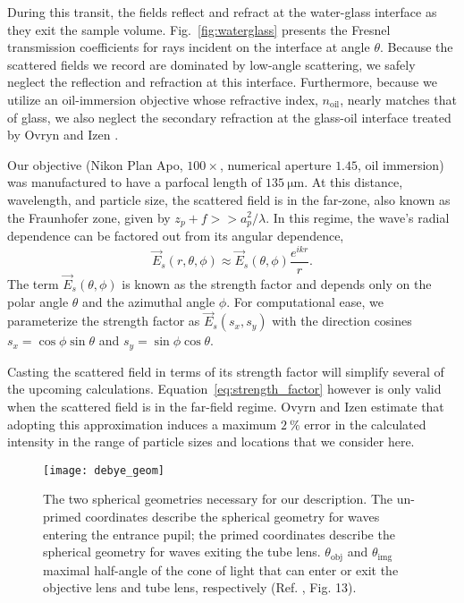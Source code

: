 During this transit, the fields reflect and refract at the water-glass interface as they
exit the sample volume. Fig.~\ref{fig:waterglass} presents the Fresnel transmission
coefficients for rays incident on the interface at angle $\theta$.
Because the scattered fields we record are dominated by low-angle scattering,
we safely neglect the reflection and refraction at this interface. Furthermore,
because we utilize an
oil-immersion objective whose refractive index, $n_{\text{oil}}$,
nearly matches that of glass, we also neglect the secondary refraction at the
glass-oil interface treated by Ovryn and Izen \cite{izen00}.

Our objective  (Nikon Plan Apo, $\num{100}\times$, numerical aperture $\num{1.45}$,
oil immersion) was manufactured to have a parfocal length of $\SI{135}{\um}$.
At this distance, wavelength, and particle size, the scattered field is in the far-zone,
also known as the Fraunhofer zone, given by $z_p + f >> a_p^2/\lambda$. In this
regime, the wave's radial dependence can be factored out from its angular dependence,
\begin{equation}
  \label{eq:strength_factor}
  \vec{E}_s(r, \theta, \phi) \approx  \vec{E}_s(\theta, \phi) \frac{e^{ikr}}{r}.
\end{equation}
The term $\vec{E}_s(\theta, \phi)$ is known as the strength factor and
depends only on the polar angle $\theta$ and the azimuthal angle $\phi$.
For computational ease, we parameterize the strength factor as $\vec{E}_s(s_x, s_y)$
with the direction cosines $s_x=\cos{\phi}\sin{\theta}$ and $s_y = \sin{\phi}\cos{\theta}$.

Casting the scattered field in terms of its strength factor will simplify
several of the upcoming calculations. Equation~\eqref{eq:strength_factor} however
is only valid when the scattered field is in the far-field regime.
Ovyrn and Izen\cite{izen00} estimate that adopting this approximation induces a maximum
$\SI{2}{\percent}$ error in the calculated intensity in the range of particle
sizes and locations that we consider here. %

\begin{figure}
  \centering
  \texttt{[image: debye\_geom]}
  \caption{The two spherical geometries necessary for our description. The un-primed coordinates
    describe the spherical geometry for waves entering the entrance pupil; the primed coordinates
    describe the spherical geometry for waves exiting the tube lens. $\theta_{\text{obj}}$ and
    $\theta_{\text{img}}$ maximal half-angle of the cone of light that can enter or exit
    the objective lens and tube lens, respectively (Ref. \cite{capoglu12}, Fig. 13).}
  \label{fig:debye_geom}
\end{figure}

